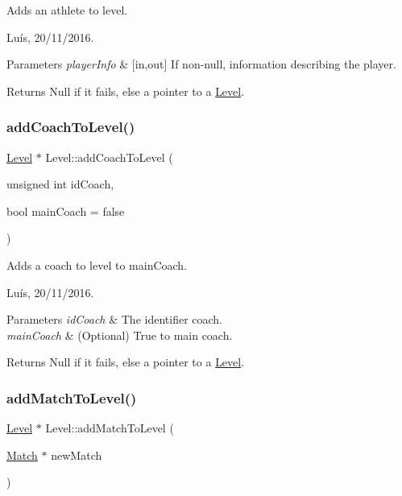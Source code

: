 Adds an athlete to level. 

Luís, 20/11/2016. 


\begin{DoxyParams}{Parameters}
{\em player\+Info} & \mbox{[}in,out\mbox{]} If non-\/null, information describing the player. \\
\hline
\end{DoxyParams}


\begin{DoxyReturn}{Returns}
Null if it fails, else a pointer to a \hyperlink{class_level}{Level}. 
\end{DoxyReturn}
\hypertarget{class_level_ae0c356fc3ffa08c834d4a9ea3d7bacc8}{}\label{class_level_ae0c356fc3ffa08c834d4a9ea3d7bacc8} 
\subsubsection{\texorpdfstring{add\+Coach\+To\+Level()}{addCoachToLevel()}}
{\footnotesize\ttfamily \hyperlink{class_level}{Level} $\ast$ Level\+::add\+Coach\+To\+Level (\begin{DoxyParamCaption}\item[{unsigned int}]{id\+Coach,  }\item[{bool}]{main\+Coach = {\ttfamily false} }\end{DoxyParamCaption})}



Adds a coach to level to \textquotesingle{}main\+Coach\textquotesingle{}. 

Luís, 20/11/2016. 


\begin{DoxyParams}{Parameters}
{\em id\+Coach} & The identifier coach. \\
\hline
{\em main\+Coach} & (Optional) True to main coach. \\
\hline
\end{DoxyParams}


\begin{DoxyReturn}{Returns}
Null if it fails, else a pointer to a \hyperlink{class_level}{Level}. 
\end{DoxyReturn}
\hypertarget{class_level_a7d49f90eae1baaaf957a68334c54ab34}{}\label{class_level_a7d49f90eae1baaaf957a68334c54ab34} 
\subsubsection{\texorpdfstring{add\+Match\+To\+Level()}{addMatchToLevel()}}
{\footnotesize\ttfamily \hyperlink{class_level}{Level} $\ast$ Level\+::add\+Match\+To\+Level (\begin{DoxyParamCaption}\item[{\hyperlink{class_match}{Match} $\ast$}]{new\+Match }\end{DoxyParamCaption})}



